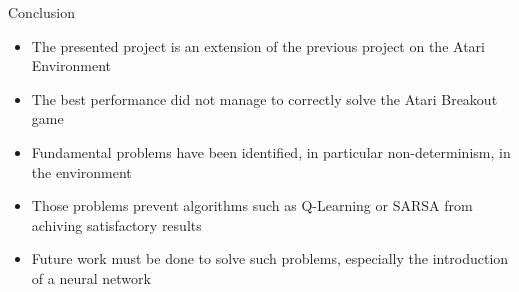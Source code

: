 \begin{frame}{Conclusion}
    \begin{itemize}
	\item The presented project is an extension of the previous project on the Atari Environment
	\item The best performance did not manage to correctly solve the Atari Breakout game
	\item Fundamental problems have been identified, in particular non-determinism, in the environment
	\item Those problems prevent algorithms such as Q-Learning or SARSA from achiving satisfactory results
	\item Future work must be done to solve such problems, especially the introduction of a neural network
    \end{itemize}
\end{frame}
